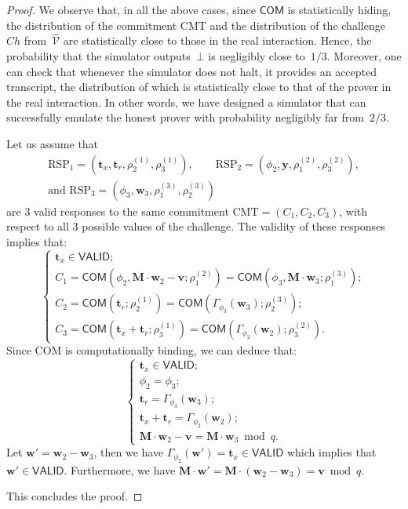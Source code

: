 \begin{proof}
  We observe that, in all the above cases, since $\mathsf{COM}$ is statistically hiding, the distribution of the commitment $\mathrm{CMT}$ and the distribution of the challenge~$Ch$ from~$\widehat{\mathcal{V}}$ are statistically close to those in the real interaction. Hence, the probability that the simulator outputs~$\bot$ is negligibly close to~$1/3$. Moreover, one can check that whenever the simulator does not halt, it provides an accepted transcript, the distribution of which is statistically close to that of the prover in the real interaction. In other words, we have designed a simulator that can successfully emulate the honest prover with probability negligibly far from~$2/3$.

  \medskip

   Let us assume that
  \begin{gather*}
    \mathrm{RSP}_1 = (\mathbf{t}_x, \mathbf{t}_r, \rho_{2}^{(1)}, \rho_{3}^{(1)}), \qquad
    \mathrm{RSP}_2 = (\phi_2, \mathbf{y}, \rho_{1}^{(2)}, \rho_{3}^{(2)}),\\
    \mbox{and }\mathrm{RSP}_3 = (\phi_3, \mathbf{w}_3, \rho_{1}^{(3)}, \rho_{2}^{(3)})
  \end{gather*}
  are $3$ valid responses to the same commitment $\mathrm{CMT} = (C_1, C_2, C_3)$, with respect to all $3$ possible values of the challenge. The validity of these responses implies that:
  \[
    \begin{cases}
      \mathbf{t}_x \in \mathsf{VALID}; \\[2.5pt]
      C_1 = \mathsf{COM}(\phi_2, \mathbf{M}\cdot \mathbf{w}_2 - \mathbf{v}; \rho_1^{(2)}) = \mathsf{COM}(\phi_3, \mathbf{M}\cdot \mathbf{w}_3; \rho_1^{(3)}); \\[2.5pt]
      C_2 = \mathsf{COM}(\mathbf{t}_r; \rho_2^{(1)}) = \mathsf{COM}(\Gamma_{\phi_3}(\mathbf{w}_3); \rho_2^{(3)}); \\[2.5pt]
      {C}_3 = \mathsf{COM}(\mathbf{t}_x + \mathbf{t}_r; \rho_3^{(1)}) = \mathsf{COM}(\Gamma_{\phi_2}(\mathbf{w}_2); \rho_3^{(2)}).
    \end{cases}
  \]
  Since \textsf{COM} is computationally binding, we can deduce that:
  \[
    \begin{cases}
    \mathbf{t}_x \in \mathsf{VALID}; \\
    \phi_2 = \phi_3; \\
    \mathbf{t}_r = \Gamma_{\phi_3}(\mathbf{w}_3);\\
    \mathbf{t}_x + \mathbf{t}_r = \Gamma_{\phi_2}(\mathbf{w}_2); \\
    \mathbf{M}\cdot \mathbf{w}_2 - \mathbf{v} = \mathbf{M}\cdot \mathbf{w}_3 \bmod q.
  \end{cases}
  \]
  Let $\mathbf{w}' = \mathbf{w}_2 - \mathbf{w}_3$, then we have $\Gamma_{\phi_2}(\mathbf{w}') = \mathbf{t}_x \in \mathsf{VALID}$ which implies that $\mathbf{w}' \in \mathsf{VALID}$. Furthermore, we have $\mathbf{M}\cdot \mathbf{w}' = \mathbf{M}\cdot (\mathbf{w}_2 - \mathbf{w}_3) = \mathbf{v} \bmod q.$

  This concludes the proof.
\end{proof}

